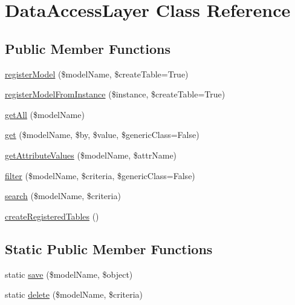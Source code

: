 \hypertarget{classDataAccessLayer}{\section{Data\-Access\-Layer Class Reference}
\label{classDataAccessLayer}
}
\subsection*{Public Member Functions}
\begin{DoxyCompactItemize}
\item 
\hyperlink{classDataAccessLayer_a20b39ae7eb19a2dd4048932f37fdee9b}{register\-Model} (\$model\-Name, \$create\-Table=True)
\item 
\hyperlink{classDataAccessLayer_ae71afc8b728e6db696eab8b81c9043d7}{register\-Model\-From\-Instance} (\$instance, \$create\-Table=True)
\item 
\hyperlink{classDataAccessLayer_a30555ff6bb6936e13b152fdae3aebd3d}{get\-All} (\$model\-Name)
\item 
\hyperlink{classDataAccessLayer_aff8cf1f209e9d1a3b7f5c007640bb81a}{get} (\$model\-Name, \$by, \$value, \$generic\-Class=False)
\item 
\hyperlink{classDataAccessLayer_a8c8849ee005e0dcc6ffc6a33709db4ee}{get\-Attribute\-Values} (\$model\-Name, \$attr\-Name)
\item 
\hyperlink{classDataAccessLayer_a9e7909fa3cca801baa35ae6f06c02ee4}{filter} (\$model\-Name, \$criteria, \$generic\-Class=False)
\item 
\hyperlink{classDataAccessLayer_a71f6b38eecd06b7ca6190292b4a2bcd7}{search} (\$model\-Name, \$criteria)
\item 
\hyperlink{classDataAccessLayer_a4b2a05cb91ef6eaa39e876c237baa805}{create\-Registered\-Tables} ()
\end{DoxyCompactItemize}
\subsection*{Static Public Member Functions}
\begin{DoxyCompactItemize}
\item 
static \hyperlink{classDataAccessLayer_a25905efc8a7497195927f06766ae0775}{save} (\$model\-Name, \$object)
\item 
static \hyperlink{classDataAccessLayer_aa4ecad29c31c804341d1a211b710211b}{delete} (\$model\-Name, \$criteria)
\end{DoxyCompactItemize}


